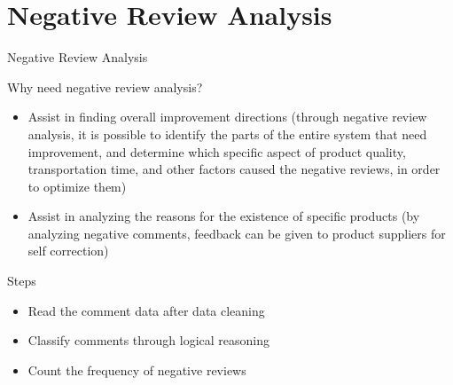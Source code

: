 \section{Negative Review Analysis}

\begin{frame}{Negative Review Analysis}
    
	\begin{block}{Why need negative review analysis?}
		\begin{itemize}
			\item Assist in finding overall improvement directions (through negative review analysis, it is possible to identify the parts of the entire system that need improvement, and determine which specific aspect of product quality, transportation time, and other factors caused the negative reviews, in order to optimize them)
			\item Assist in analyzing the reasons for the existence of specific products (by analyzing negative comments, feedback can be given to product suppliers for self correction)
		\end{itemize}
	\end{block}
    
	\begin{block}{Steps}
		\begin{itemize}
			\item Read the comment data after data cleaning
			\item Classify comments through logical reasoning
			\item Count the frequency of negative reviews
		\end{itemize}
	\end{block}

\end{frame}

